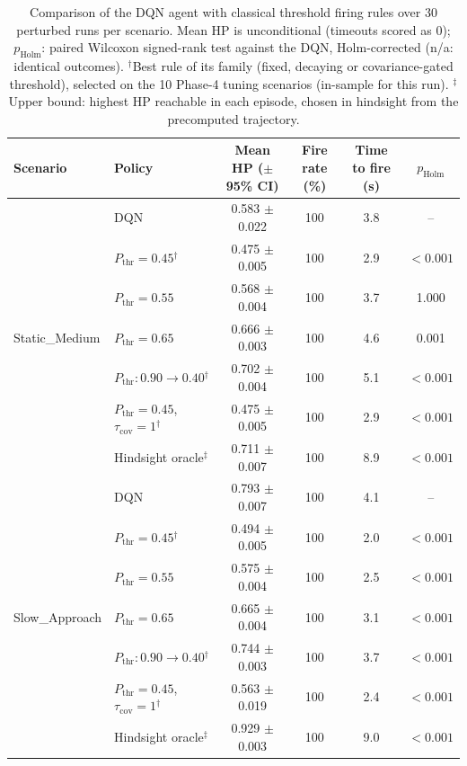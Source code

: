 \begin{table}[htbp]
\centering
\caption{Comparison of the DQN agent with classical threshold firing rules over 30 perturbed runs per scenario. Mean HP is unconditional (timeouts scored as 0); $p_{\mathrm{Holm}}$: paired Wilcoxon signed-rank test against the DQN, Holm-corrected (n/a: identical outcomes). $^{\dagger}$Best rule of its family (fixed, decaying or covariance-gated threshold), selected on the 10 Phase-4 tuning scenarios (in-sample for this run). $^{\ddagger}$Upper bound: highest HP reachable in each episode, chosen in hindsight from the precomputed trajectory.}
\label{tab:comparison-traditional-rl}
\small
\begin{tabular}{llcccc}
\toprule
\textbf{Scenario} & \textbf{Policy} & \textbf{Mean HP ($\pm$95\% CI)} & \textbf{Fire rate (\%)} & \textbf{Time to fire (s)} & $p_{\mathrm{Holm}}$ \\
\midrule
\multirow{7}{*}{Static\_Medium} & DQN & 0.583 $\pm$ 0.022 & 100 & 3.8 & -- \\
 & $P_{\mathrm{thr}}=0.45$$^{\dagger}$ & 0.475 $\pm$ 0.005 & 100 & 2.9 & $<0.001$ \\
 & $P_{\mathrm{thr}}=0.55$ & 0.568 $\pm$ 0.004 & 100 & 3.7 & 1.000 \\
 & $P_{\mathrm{thr}}=0.65$ & 0.666 $\pm$ 0.003 & 100 & 4.6 & 0.001 \\
 & $P_{\mathrm{thr}}: 0.90 \to 0.40$$^{\dagger}$ & 0.702 $\pm$ 0.004 & 100 & 5.1 & $<0.001$ \\
 & $P_{\mathrm{thr}}=0.45$, $\tau_{\mathrm{cov}}=1$$^{\dagger}$ & 0.475 $\pm$ 0.005 & 100 & 2.9 & $<0.001$ \\
 & Hindsight oracle$^{\ddagger}$ & 0.711 $\pm$ 0.007 & 100 & 8.9 & $<0.001$ \\
\midrule
\multirow{7}{*}{Slow\_Approach} & DQN & 0.793 $\pm$ 0.007 & 100 & 4.1 & -- \\
 & $P_{\mathrm{thr}}=0.45$$^{\dagger}$ & 0.494 $\pm$ 0.005 & 100 & 2.0 & $<0.001$ \\
 & $P_{\mathrm{thr}}=0.55$ & 0.575 $\pm$ 0.004 & 100 & 2.5 & $<0.001$ \\
 & $P_{\mathrm{thr}}=0.65$ & 0.665 $\pm$ 0.004 & 100 & 3.1 & $<0.001$ \\
 & $P_{\mathrm{thr}}: 0.90 \to 0.40$$^{\dagger}$ & 0.744 $\pm$ 0.003 & 100 & 3.7 & $<0.001$ \\
 & $P_{\mathrm{thr}}=0.45$, $\tau_{\mathrm{cov}}=1$$^{\dagger}$ & 0.563 $\pm$ 0.019 & 100 & 2.4 & $<0.001$ \\
 & Hindsight oracle$^{\ddagger}$ & 0.929 $\pm$ 0.003 & 100 & 9.0 & $<0.001$ \\

\end{tabular}
\end{table}
